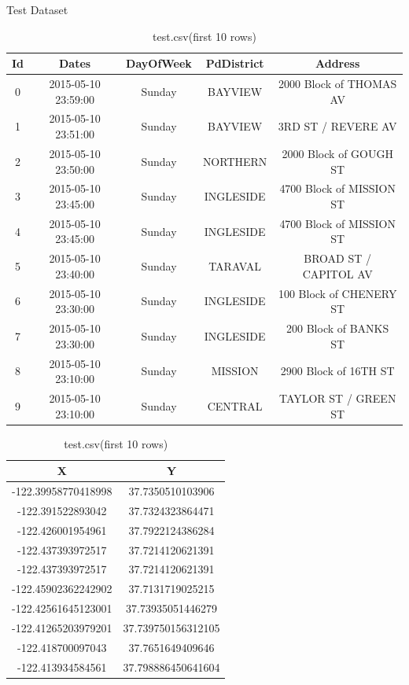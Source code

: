 \documentclass[11pt]{beamer}
\begin{document}
\begin{frame}{Test Dataset}
\begin{table}[htbp]
\centering
\scriptsize
\setlength\tabcolsep{2pt}
\begin{tabular}{|ccccc}\hline
Id&Dates&DayOfWeek&PdDistrict&Address\\\hline\hline
0&2015-05-10 23:59:00&Sunday&BAYVIEW&2000 Block of THOMAS AV\\
1&2015-05-10 23:51:00&Sunday&BAYVIEW&3RD ST / REVERE AV\\
2&2015-05-10 23:50:00&Sunday&NORTHERN&2000 Block of GOUGH ST\\
3&2015-05-10 23:45:00&Sunday&INGLESIDE&4700 Block of MISSION ST\\
4&2015-05-10 23:45:00&Sunday&INGLESIDE&4700 Block of MISSION ST\\
5&2015-05-10 23:40:00&Sunday&TARAVAL&BROAD ST / CAPITOL AV\\
6&2015-05-10 23:30:00&Sunday&INGLESIDE&100 Block of CHENERY ST\\
7&2015-05-10 23:30:00&Sunday&INGLESIDE&200 Block of BANKS ST\\
8&2015-05-10 23:10:00&Sunday&MISSION&2900 Block of 16TH ST\\
9&2015-05-10 23:10:00&Sunday&CENTRAL&TAYLOR ST / GREEN ST\\\hline
\end{tabular}
\begin{tabular}{cc|}\hline
X&Y\\\hline\hline
-122.39958770418998&37.7350510103906\\
-122.391522893042&37.7324323864471\\
-122.426001954961&37.7922124386284\\
-122.437393972517&37.7214120621391\\
-122.437393972517&37.7214120621391\\
-122.45902362242902&37.7131719025215\\
-122.42561645123001&37.73935051446279\\
-122.41265203979201&37.739750156312105\\
-122.418700097043&37.7651649409646\\
-122.413934584561&37.798886450641604\\\hline
\end{tabular}
\caption{test.csv(first 10 rows)}
\label{tab:test.csv}
\end{table}
\end{frame}
\end{document}
